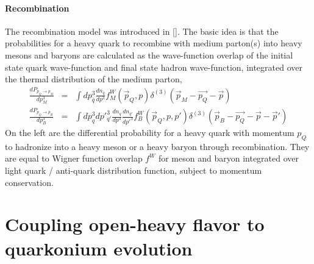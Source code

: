 \paragraph{Recombination}
The recombination model was introduced in []. 
The basic idea is that the probabilities for a heavy quark to recombine with medium parton(s) into heavy mesons and baryons are calculated as the wave-function overlap of the initial state quark wave-function and final state hadron wave-function, integrated over the thermal distribution of the medium parton,
\begin{eqnarray}
\frac{dP_{p_Q \rightarrow p_M}}{dp_M^3} &=& \int dp^3_{\bar{q}} \frac{dn_{\bar{q}}}{dp^3} f^W_{M}(\vec{p}_Q, p)\delta^{(3)}(\vec{p}_M-\vec{p_Q}-\vec{p}) \\
\frac{dP_{p_Q \rightarrow p_B}}{dp_B^3} &=& \int dp^3_{q}dp'^3_{q'} \frac{dn_{q}}{dp^3}\frac{dn_{q'}}{dp'^3} f^W_{B}(\vec{p}_Q, p, p')\delta^{(3)}(\vec{p}_B-\vec{p_Q}-\vec{p}-\vec{p}') 
\end{eqnarray}
On the left are the differential probability for a heavy quark with momentum $p_Q$ to hadronize into a heavy meson or a heavy baryon through recombination.
They are equal to Wigner function overlap $f^W$ for meson and baryon integrated over light quark / anti-quark distribution function, subject to momentum conservation.

\section{Coupling open-heavy flavor to quarkonium evolution}
